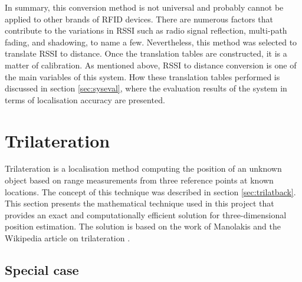 In summary, this conversion method is not universal and probably cannot be applied to other brands of RFID devices. There are numerous factors that contribute to the variations in RSSI such as radio signal reflection, multi-path fading, and shadowing, to name a few. Nevertheless, this method was selected to translate RSSI to distance. Once the translation tables are constructed, it is a matter of calibration. As mentioned above, RSSI to distance conversion is one of the main variables of this system. How these translation tables performed is discussed in section \ref{sec:syseval}, where the evaluation results of the system in terms of localisation accuracy are presented.


\section{Trilateration}
\label{sec:trilatmeth}

Trilateration is a localisation method computing the position of an unknown object based on range measurements from three reference points at known locations. The concept of this technique was described in section \ref{sec:trilatback}. This section presents the mathematical technique used in this project that provides an exact and computationally efficient solution for three-dimensional position estimation. The solution is based on the work of Manolakis \cite{Manolakis1996} and the Wikipedia article on trilateration \cite{Wikipedi2013}.

\subsection{Special case}

